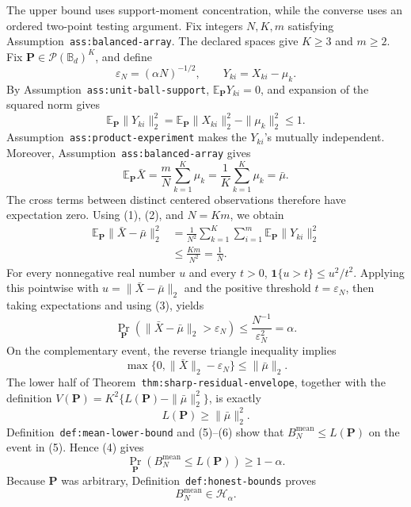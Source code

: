 The upper bound uses support-moment concentration, while the converse uses an ordered two-point testing argument. Fix integers \(N,K,m\) satisfying Assumption~\texttt{ass:balanced-array}. The declared spaces give \(K\geq 3\) and \(m\geq 2\). Fix \(\mathbf P\in\mathcal P(\mathbb B_d)^K\), and define
\[
\varepsilon_N=(\alpha N)^{-1/2},
\qquad
Y_{ki}=X_{ki}-\mu_k.
\]
By Assumption~\texttt{ass:unit-ball-support}, \(\mathbb E_{\mathbf P}Y_{ki}=0\), and expansion of the squared norm gives
\[
\mathbb E_{\mathbf P}\|Y_{ki}\|_2^2
=\mathbb E_{\mathbf P}\|X_{ki}\|_2^2-\|\mu_k\|_2^2
\leq 1. \tag{1}
\]
Assumption~\texttt{ass:product-experiment} makes the \(Y_{ki}\)'s mutually independent. Moreover, Assumption~\texttt{ass:balanced-array} gives
\[
\mathbb E_{\mathbf P}\bar X
=\frac{m}{N}\sum_{k=1}^K\mu_k
=\frac1K\sum_{k=1}^K\mu_k
=\bar\mu. \tag{2}
\]
The cross terms between distinct centered observations therefore have expectation zero. Using (1), (2), and \(N=Km\), we obtain
\[
\begin{aligned}
\mathbb E_{\mathbf P}\|\bar X-\bar\mu\|_2^2
&=\frac1{N^2}\sum_{k=1}^K\sum_{i=1}^m
  \mathbb E_{\mathbf P}\|Y_{ki}\|_2^2\\
&\leq \frac{Km}{N^2}
=\frac1N. \tag{3}
\end{aligned}
\]
For every nonnegative real number \(u\) and every \(t>0\), \(\mathbf 1\{u>t\}\leq u^2/t^2\). Applying this pointwise with \(u=\|\bar X-\bar\mu\|_2\) and the positive threshold \(t=\varepsilon_N\), then taking expectations and using (3), yields
\[
\Pr_{\mathbf P}\!\left(\|\bar X-\bar\mu\|_2>\varepsilon_N\right)
\leq \frac{N^{-1}}{\varepsilon_N^2}
=\alpha. \tag{4}
\]
On the complementary event, the reverse triangle inequality implies
\[
\max\{0,\|\bar X\|_2-\varepsilon_N\}
\leq \|\bar\mu\|_2. \tag{5}
\]
The lower half of Theorem~\texttt{thm:sharp-residual-envelope}, together with the definition \(V(\mathbf P)=K^2\{L(\mathbf P)-\|\bar\mu\|_2^2\}\), is exactly
\[
L(\mathbf P)\geq \|\bar\mu\|_2^2. \tag{6}
\]
Definition~\texttt{def:mean-lower-bound} and (5)--(6) show that \(B_N^{\mathrm{mean}}\leq L(\mathbf P)\) on the event in (5). Hence (4) gives
\[
\Pr_{\mathbf P}\!\left(B_N^{\mathrm{mean}}\leq L(\mathbf P)\right)
\geq 1-\alpha. \tag{7}
\]
Because \(\mathbf P\) was arbitrary, Definition~\texttt{def:honest-bounds} proves
\[
B_N^{\mathrm{mean}}\in\mathcal H_\alpha. \tag{8}
\]

